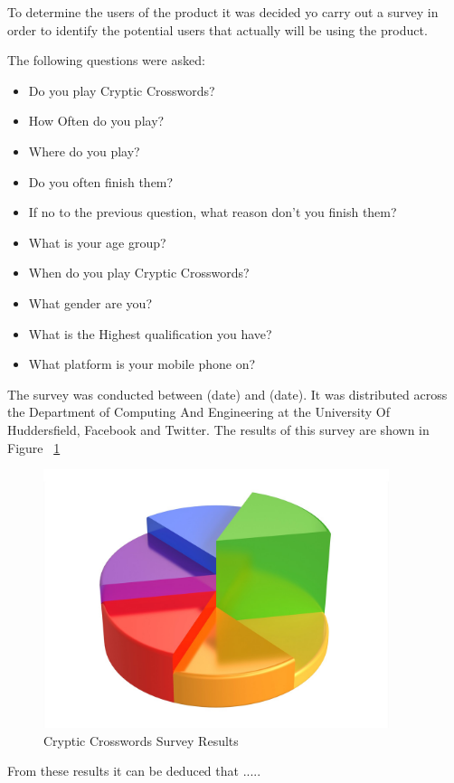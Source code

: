 To determine the users of the product it was decided yo carry out a survey in
order to identify the potential users that actually will be using the product.

The following questions were asked:

\begin{itemize}
    \item Do you play Cryptic Crosswords?
    \item How Often do you play?
    \item Where do you play?
    \item Do you often finish them?
    \item If no to the previous question, what reason don't you finish them?
    \item What is your age group?
    \item When do you play Cryptic Crosswords?
    \item What gender are you?
    \item What is the Highest qualification you have?
    \item What platform is your mobile phone on?
\end{itemize}

The survey was conducted between (date) and (date). It was distributed across
the Department of Computing And Engineering at the University Of Huddersfield,
Facebook and Twitter. The results of this survey are shown in Figure
~\ref{fig:survey_results}


\begin{figure}[H]
\includegraphics[width=0.9\textwidth]{requirements/project_drivers/survey_results.png}
\caption{Cryptic Crosswords Survey Results}
\label{fig:survey_results}
\end{figure}

From these results it can be deduced that .....